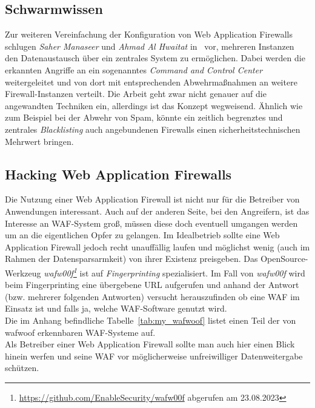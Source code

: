 \subsection{Schwarmwissen}
Zur weiteren Vereinfachung der Konfiguration von Web Application Firewalls schlugen \emph{Saher Manaseer} und \emph{Ahmad Al Hwaitat} in~\cite{Manaseer2018} vor, mehreren Instanzen den Datenaustausch über ein zentrales System zu ermöglichen. Dabei werden die erkannten Angriffe an ein sogenanntes \emph{Command and Control Center} weitergeleitet und von dort mit entsprechenden Abwehrmaßnahmen an weitere Firewall-Instanzen verteilt. Die Arbeit geht zwar nicht genauer auf die angewandten Techniken ein, allerdings ist das Konzept wegweisend. Ähnlich wie zum Beispiel bei der Abwehr von Spam, könnte ein zeitlich begrenztes und zentrales \emph{Blacklisting} auch angebundenen Firewalls einen sicherheitstechnischen Mehrwert bringen.




\subsection{Hacking Web Application Firewalls}

Die Nutzung einer Web Application Firewall ist nicht nur für die Betreiber von Anwendungen interessant. Auch auf der anderen Seite, bei den Angreifern, ist das Interesse an WAF-System groß, müssen diese doch eventuell umgangen werden um an die eigentlichen Opfer zu gelangen. Im Idealbetrieb sollte eine Web Application Firewall jedoch recht unauffällig laufen und möglichst wenig (auch im Rahmen der Datensparsarmkeit) von ihrer Existenz preisgeben. Das OpenSource-Werkzeug \emph{wafw00f\footnote{\url{https://github.com/EnableSecurity/wafw00f} abgerufen am 23.08.2023}} ist auf \emph{Fingerprinting} spezialisiert. Im Fall von \emph{wafw00f} wird beim Fingerprinting eine übergebene URL aufgerufen und anhand der Antwort (bzw. mehrerer folgenden Antworten) versucht herauszufinden ob eine WAF im Einsatz ist und falls ja, welche WAF-Software genutzt wird.\\ Die im Anhang befindliche Tabelle~\ref{tab:my_wafwoof} listet einen Teil der von wafwoof erkennbaren WAF-Systeme auf.\\ Als Betreiber einer Web Application Firewall sollte man auch hier einen Blick hinein werfen und seine WAF vor möglicherweise unfreiwilliger Datenweitergabe schützen. 

